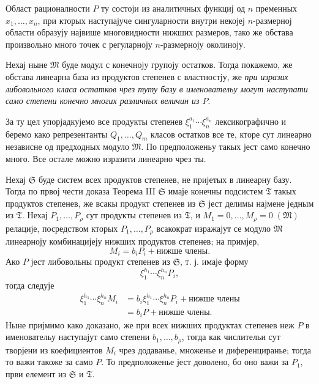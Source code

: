 ﻿\documentclass[11pt]{article}
\begin{document}
Област рационалности \(P\) ту состоји из аналитичных функциј од \(n\) пременных \(x_1,
\ldots,x_n\), при кторых наступајуче сингуларности внутри некојеј \(n\)-размерној области образују највише многовидности нижших размеров, тако же обстава произвольно много точек с регуларноју \(n\)-размерноју околиноју.

Нехај ныне \(\mathfrak M\) буде модул с конечноју групоју остатков. Тогда покажемо, же обстава линеарна база из продуктов степенев с властностју, же \textit{при изразих либовольного класа остатков чрез туту базу в именовательу могут наступати само степени конечно многих различных величин из \(P\)}.

За ту цел упорјадкујемо все продукты степенев \(\xi_1^{a_1}\cdots\xi_n^{a_n}\) лексикографично и беремо како репрезентанты \(Q_1,
\ldots,Q_m\) класов остатков все те, кторе сут линеарно независне од предходных модуло \(\mathfrak M\). По предположеньу такых јест само конечно много. Все остале можно изразити линеарно чрез ты.

Нехај \(\mathfrak S\) буде систем всех продуктов степенев, не пријетых в линеарну базу. Тогда по првој чести доказа Теорема III \(\mathfrak S\) имаје конечны подсистем \(\mathfrak T\) такых продуктов степенев, же всакы продукт степенев из \(\mathfrak S\) јест делимы најмене једным из \(\mathfrak T\). Нехај \(P_1,
\ldots,P_\rho\) сут продукты степенев из \(\mathfrak T\), и \(M_1=0,
\ldots,M_\rho=0\;(\mathfrak M)\) релације, посредством кторых \(P_1,
\ldots,P_\rho\) всакократ изражајут се модуло \(\mathfrak M\) линеарноју комбинацијеју нижших продуктов степенев; на примјер,
\[
 M_i=b_iP_i+\text{нижше члены}.
\]
Ако \(P\) јест либовольны продукт степенев из \(\mathfrak S\), т. ј. имаје форму
\[
 \xi_1^{h_1}\cdots\xi_n^{h_n}P_i,
\]
тогда следује
\[
\begin{aligned}
 \xi_1^{h_1}\cdots\xi_n^{h_n}M_i
 &=b_i\xi_1^{h_1}\cdots\xi_n^{h_n}P_i+\text{нижше члены}\\
 &=b_iP+\text{нижше члены}.
\end{aligned}
\]
Ныне пријмимо како доказано, же при всех нижших продуктах степенев неж \(P\) в именовательу наступајут само степени \(b_1,
\ldots,b_\rho\), тогда как числительи сут творјени из коефициентов \(M_i\) чрез додаванье, множенье и диференциранье; тогда то важи такоже за само \(P\). То предположенье јест доволено, бо оно важи за \(P_1\), први елемент из \(\mathfrak S\) и \(\mathfrak T\).
\end{document}
